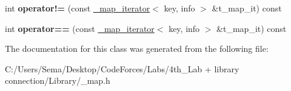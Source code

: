\begin{DoxyCompactItemize}
\item 
\mbox{\label{class__map__iterator_a25eda609ea5776696c6ad0963cd7756b}} 
int {\bfseries operator!=} (const \mbox{\hyperlink{class__map__iterator}{\+\_\+map\+\_\+iterator}}$<$ key, info $>$ \&t\+\_\+map\+\_\+it) const
\item 
\mbox{\label{class__map__iterator_a551a3e328a41b30edcf038b612a13e5f}} 
int {\bfseries operator==} (const \mbox{\hyperlink{class__map__iterator}{\+\_\+map\+\_\+iterator}}$<$ key, info $>$ \&t\+\_\+map\+\_\+it) const
\end{DoxyCompactItemize}


The documentation for this class was generated from the following file\+:\begin{DoxyCompactItemize}
\item 
C\+:/\+Users/\+Sema/\+Desktop/\+Code\+Forces/\+Labs/4th\+\_\+\+Lab + library connection/\+Library/\+\_\+map.\+h\end{DoxyCompactItemize}
